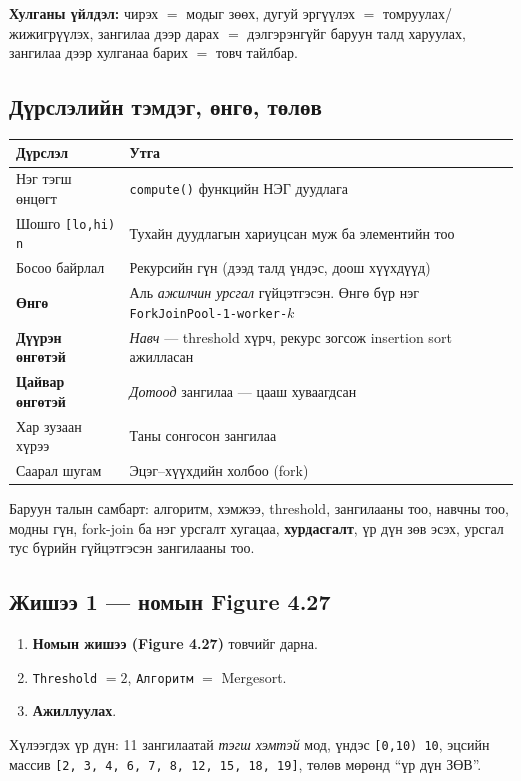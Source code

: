 \documentclass[11pt,a4paper]{article}
\begin{document}
\textbf{Хулганы үйлдэл:} чирэх $=$ модыг зөөх, дугуй эргүүлэх $=$ томруулах/жижигрүүлэх,
зангилаа дээр дарах $=$ дэлгэрэнгүйг баруун талд харуулах, зангилаа дээр
хулганаа барих $=$ товч тайлбар.

\subsection{Дүрслэлийн тэмдэг, өнгө, төлөв}

\begin{center}
\small
\begin{tabular}{L{4.2cm}L{10.3cm}}
\toprule
Дүрслэл & Утга \\
\midrule
Нэг тэгш өнцөгт & \texttt{compute()} функцийн НЭГ дуудлага \\
Шошго \texttt{[lo,hi) n} & Тухайн дуудлагын хариуцсан муж ба элементийн тоо \\
Босоо байрлал & Рекурсийн гүн (дээд талд үндэс, доош хүүхдүүд) \\
\textbf{Өнгө} & Аль \emph{ажилчин урсгал} гүйцэтгэсэн. Өнгө бүр нэг
\texttt{ForkJoinPool-1-worker-$k$} \\
\textbf{Дүүрэн өнгөтэй} & \emph{Навч} --- threshold хүрч, рекурс зогсож
insertion sort ажилласан \\
\textbf{Цайвар өнгөтэй} & \emph{Дотоод} зангилаа --- цааш хуваагдсан \\
Хар зузаан хүрээ & Таны сонгосон зангилаа \\
Саарал шугам & Эцэг--хүүхдийн холбоо (fork) \\
\bottomrule
\end{tabular}
\end{center}

Баруун талын самбарт: алгоритм, хэмжээ, threshold, зангилааны тоо, навчны тоо,
модны гүн, fork-join ба нэг урсгалт хугацаа, \textbf{хурдасгалт}, үр дүн зөв
эсэх, урсгал тус бүрийн гүйцэтгэсэн зангилааны тоо.

\subsection{Жишээ 1 --- номын Figure 4.27}
\begin{enumerate}[nosep,leftmargin=*]
  \item \textbf{Номын жишээ (Figure 4.27)} товчийг дарна.
  \item \texttt{Threshold} $= 2$, \texttt{Алгоритм} $=$ Mergesort.
  \item \textbf{Ажиллуулах}.
\end{enumerate}
Хүлээгдэх үр дүн: 11 зангилаатай \emph{тэгш хэмтэй} мод, үндэс \texttt{[0,10) 10},
эцсийн массив \texttt{[2, 3, 4, 6, 7, 8, 12, 15, 18, 19]}, төлөв мөрөнд
``үр дүн ЗӨВ''.
\end{document}
